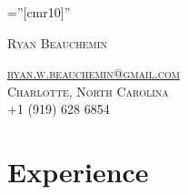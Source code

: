 \documentclass[a4paper,10pt]{article} %
\begin{document}
\pagestyle{empty} %

\font\fb=''[cmr10]'' %

\vspace{-10pt}
\par{\huge \textsc{Ryan Beauchemin}\par}
\textsc{\href{mailto:ryan.w.beauchemin@gmail.com}{ryan.w.beauchemin@gmail.com}}\\
\textsc{Charlotte, North Carolina} \\
+1 (919) 628 6854\\

\vspace{-10pt}
\section{Experience} %
\end{document}

